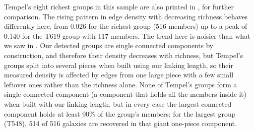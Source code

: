 \documentclass[9pt,a4paper,twocolumn,twoside]{rho-class/rho}
\begin{document}
Tempel's eight richest groups in this sample are also printed in
, for further comparison. The rising pattern in edge density
with decreasing richness behaves differently here, from 0.026 for the richest group
(516 members) up to a peak of 0.140 for the T619 group with 117 members. The trend here
is noisier than what we saw in . Our detected groups are single
connected components by construction, and therefore their density decreases with
richness, but Tempel's groups split into several pieces when built
using our linking length, so their measured density is affected by edges from one
large piece with a few small leftover ones rather than the richness alone.
None of Tempel's groups form a single connected component (a component that holds all the members inside it) when built with our
linking length, but in every case the largest connected component holds at least 90\% of the
group's members; for the largest group (T548), 514 of 516 galaxies are recovered in that giant one-piece component.
\end{document}
